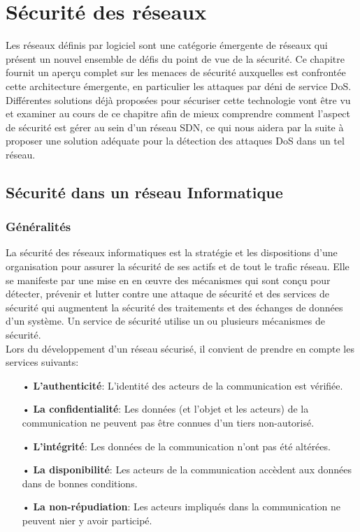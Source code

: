 \chapter{Sécurité des réseaux}

\label{Chapter2} 

Les réseaux définis par logiciel sont une catégorie émergente de réseaux qui présent un nouvel ensemble de défis du point de vue de la sécurité. Ce chapitre fournit un aperçu complet sur les menaces de sécurité auxquelles est confrontée cette architecture émergente, en particulier les attaques par déni de service DoS. Différentes solutions déjà proposées pour sécuriser cette technologie vont être vu et examiner au cours de ce chapitre afin de mieux comprendre comment l'aspect de sécurité est gérer au sein d'un réseau SDN, ce qui nous aidera par la suite à proposer une solution adéquate pour la détection des attaques DoS dans un tel réseau.

\section{Sécurité dans un réseau Informatique}

\subsection{Généralités}
La sécurité des réseaux informatiques est la stratégie et les dispositions d’une organisation pour assurer la sécurité de ses actifs et de tout le trafic réseau. Elle se manifeste par une mise en en œuvre des mécanismes qui sont conçu pour détecter, prévenir et lutter contre une attaque de sécurité et des services de sécurité qui augmentent la sécurité des traitements et des échanges de données d’un système. Un service de sécurité utilise un ou plusieurs mécanismes de sécurité.\\

\noindent Lors du développement d’un réseau sécurisé, il convient de prendre en compte les services suivants:\\
\begin{itemize}
\item[•]\textbf{L’authenticité}: L’identité des acteurs de la communication est vérifiée.\\
\item[•]\textbf{La confidentialité}: Les données (et l'objet et les acteurs) de la communication ne peuvent pas être connues d’un tiers non-autorisé.\\
\item[•]\textbf{L’intégrité}: Les données de la communication n’ont pas été altérées.\\
\item[•]\textbf{La disponibilité}: Les acteurs de la communication accèdent aux données dans de bonnes conditions.\\
\item[•]\textbf{La non-répudiation}: Les acteurs impliqués dans la communication ne peuvent nier y avoir participé.
\end{itemize}

